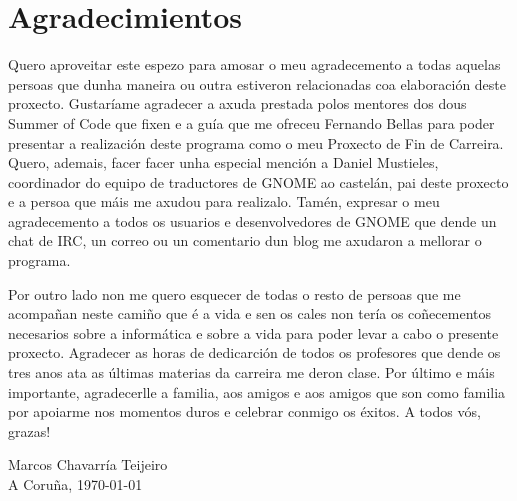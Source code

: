 %
%

\section*{Agradecimientos}

Quero aproveitar este espezo para amosar o meu agradecemento a todas aquelas persoas que dunha maneira ou outra estiveron relacionadas coa elaboración deste proxecto. Gustaríame agradecer a axuda prestada polos mentores dos dous Summer of Code que fixen e a guía que me ofreceu Fernando Bellas para poder presentar a realización deste programa como o meu Proxecto de Fin de Carreira. Quero, ademais, facer facer unha especial mención a Daniel Mustieles, coordinador do equipo de traductores de GNOME ao castelán, pai deste proxecto e a persoa que máis me axudou para realizalo. Tamén, expresar o meu agradecemento a todos os usuarios e desenvolvedores de GNOME que dende un chat de IRC, un correo ou un comentario dun blog me axudaron a mellorar o programa.

Por outro lado non me quero esquecer de todas o resto de persoas que me acompañan neste camiño que é a vida e sen os cales non tería os coñecementos necesarios sobre a informática e sobre a vida para poder levar a cabo o presente proxecto. Agradecer as horas de dedicarción de todos os profesores que dende os tres anos ata as últimas materias da carreira me deron clase. Por último e máis importante, agradecerlle a familia, aos amigos e aos amigos que son como familia por apoiarme nos momentos duros e celebrar conmigo os éxitos. A todos vós, grazas!


\begin{flushright}
  Marcos Chavarría Teijeiro \\
  A Coruña, \today
\end{flushright}

